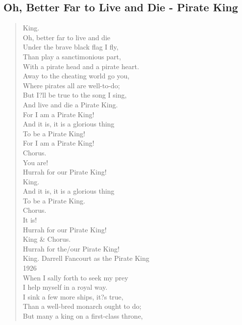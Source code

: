 \documentclass[11pt]{article}
\begin{document}
\subsection{Oh, Better Far to Live and Die - Pirate King}
\label{sec:orgf013028}
\begin{verse}
King.\\
Oh, better far to live and die\\
Under the brave black flag I fly,\\
Than play a sanctimonious part,\\
With a pirate head and a pirate heart.\\
Away to the cheating world go you,\\
Where pirates all are well-to-do;\\
But I?ll be true to the song I sing,\\
And live and die a Pirate King.\\
\vspace*{1em}
For I am a Pirate King!\\
And it is, it is a glorious thing\\
To be a Pirate King!\\
\vspace*{1em}
For I am a Pirate King!\\
Chorus.\\
You are!\\
Hurrah for our Pirate King!\\
King.\\
And it is, it is a glorious thing\\
To be a Pirate King.\\
Chorus.\\
It is!\\
Hurrah for our Pirate King!\\
King \& Chorus.\\
Hurrah for the/our Pirate King!\\
\vspace*{1em}
King. Darrell Fancourt as the Pirate King\\
1926\\
\vspace*{1em}
When I sally forth to seek my prey\\
I help myself in a royal way.\\
I sink a few more ships, it?s true,\\
Than a well-bred monarch ought to do;\\
But many a king on a first-class throne,\\

\end{verse}
\end{document}
